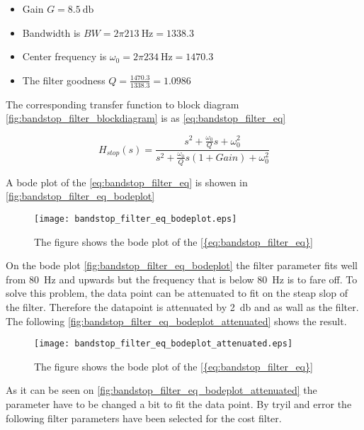 \begin{itemize}
\item Gain $G = \SI{8.5}{\decibel}$
\item Bandwidth is $BW = 2\pi \SI{213}{\hertz} = 1338.3$
\item Center frequency is $\omega_0 = 2\pi \SI{234}{\hertz} = 1470.3$
\item The filter goodness $Q = \frac{1470.3}{1338.3} = 1.0986$
\end{itemize}

The corresponding transfer function to block diagram \autoref{fig:bandstop_filter_blockdiagram} is as \autoref{eq:bandstop_filter_eq}

\begin{equation}\label{eq:bandstop_filter_eq}
H_{stop}(s) = \frac{s^2+\frac{\omega_0}{Q}s+\omega_0^2}{s^2+\frac{\omega_0}{Q}s(1+Gain)+\omega_0^2}
\end{equation}

A bode plot of the \autoref{eq:bandstop_filter_eq} is showen in \autoref{fig:bandstop_filter_eq_bodeplot}



\begin{figure}[H]
	\centering
	\texttt{[image: bandstop\_filter\_eq\_bodeplot.eps]}
	\caption{The figure shows the bode plot of the \autoref{{eq:bandstop_filter_eq}}}
		\label{fig:bandstop_filter_eq_bodeplot}
\end{figure}

On the bode plot  \autoref{fig:bandstop_filter_eq_bodeplot} the filter parameter fits well from \SI{80}{\hertz} and upwards but the frequency that is below \SI{80}{\hertz} is to fare off. To solve this problem, the data point can be attenuated to fit on the steap slop of the filter. Therefore the datapoint is attenuated by \SI{2}{\decibel} and as wall as the filter. The following \autoref{fig:bandstop_filter_eq_bodeplot_attenuated} shows the result.

\begin{figure}[H]
	\centering
	\texttt{[image: bandstop\_filter\_eq\_bodeplot\_attenuated.eps]}
	\caption{The figure shows the bode plot of the \autoref{{eq:bandstop_filter_eq}}}
		\label{fig:bandstop_filter_eq_bodeplot_attenuated}
\end{figure}


As it can be seen on \autoref{fig:bandstop_filter_eq_bodeplot_attenuated} the parameter have to be changed a bit to fit the data point. By tryil and error the following filter parameters have been selected for the cost filter. 



